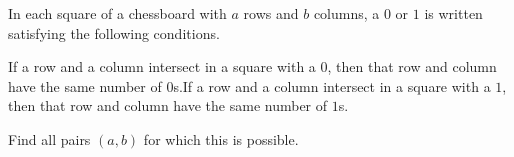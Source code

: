 In each square of a chessboard with $a$ rows and $b$ columns, a $0$ or $1$ is written satisfying the following conditions.

If a row and a column intersect in a square with a $0$,  then that row and column have the same number of $0$s.If a row and a column intersect in a square with a $1$,  then that row and column have the same number of $1$s.

Find all pairs $(a,b)$ for which this is possible.
